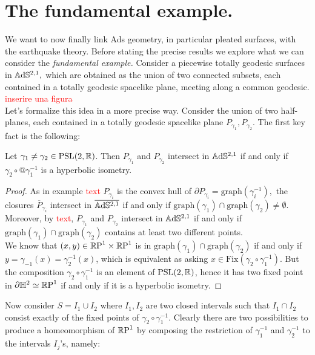 \section{The fundamental example.} We want to now finally link Ads geometry, in particular pleated surfaces, with the earthquake theory. Before stating the precise results we explore what we can consider the \textit{fundamental example.} Consider a piecewise totally geodesic surfaces in $\A^{2,1},$ which are obtained as the union of two connected subsets, each contained in a totally geodesic spacelike plane, meeting along a common geodesic. \textcolor{red}{inserire una figura}\\
Let's formalize this idea in a more precise way. Consider the union of two half-planes, each contained in a totally geodesic spacelike plane $P_{\gamma_1},P_{\gamma_2}$. The first key fact is the following:

\begin{lemma}\label{Mati}
    Let $\gamma_1\neq\gamma_2\in\PSL$. Then $P_{\gamma_1}$ and $P_{\gamma_2}$ intersect in $\A^{2,1}$ if and only if $\gamma_2\circ@{\gamma_1^{-1}}$ is a hyperbolic isometry. 
\end{lemma}
\begin{proof}
    As in example \textcolor{red}{text} $P_{\gamma_i}$ is the convex hull of $\partial P_{\gamma_i}=\text{graph}(\gamma_i^{-1}),$ the closures $\overline{P}_{\gamma_i}$  intersect in $\overline{\A^{2,1}}$ if and only if $\text{graph}(\gamma_1)\cap\text{graph}(\gamma_2)\neq\emptyset$. Moreover, by \textcolor{red}{text}, $P_{\gamma_1}$ and $P_{\gamma_2}$ intersect in $\A^{2,1}$ if and only if $\text{graph}(\gamma_1)\cap\text{graph}(\gamma_2)$ contains at least two different points. \\
    We know that $(x,y)\in\T$ is in $\text{graph}(\gamma_1)\cap\text{graph}(\gamma_2)$ if and only if $y=\gamma_{-1}(x)=\gamma_2^{-1}(x)$, which is equivalent as asking $x\in\text{Fix}(\gamma_2\circ\gamma_1^{-1})$. But the composition $\gamma_2\circ\gamma_1^{-1}$ is an element of $\PSL$, hence it has two fixed point in $\partial\H^2\simeq\S$ if and only if it is a hyperbolic isometry.
\end{proof}

Now consider $S=I_1\cup I_2$ where $I_1,I_2$ are two closed intervals such that $I_1\cap I_2$ consist exactly of the fixed points of $\gamma_2\circ\gamma_1^{-1}.$ Clearly there are two possibilities to produce a homeomorphism of $\S$ by composing the restriction of $\gamma_1^{-1}$ and $\gamma_2^{-1}$ to the intervals $I_j$'s, namely: 

